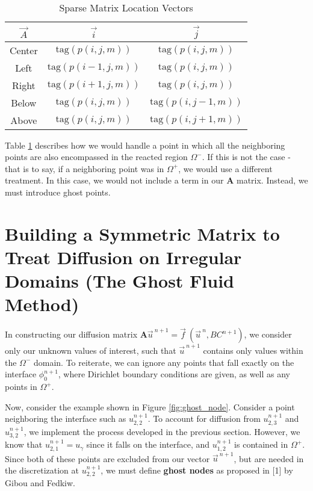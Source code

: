 \documentclass[oneside,12pt,final]{/Applications/TeX/packages/ucthesis-CA2012}
\begin{document}
\begin{mainmatter}
\begin{table} [ht]
\caption{Sparse Matrix Location Vectors}\label{table:Sparse_Vectors}
\centering
\begin{tabular}{c c c}
\hline
$\vec{A}$ & $\vec{i}$ & $\vec{j}$\\ \hline
Center   & $\text{tag}(p(i,j,m))$        &  $\text{tag}(p(i,j,m))$     \\
Left        & $\text{tag}(p(i-1,j,m))$    &  $\text{tag}(p(i,j,m))$     \\
Right     & $\text{tag}(p(i+1,j,m))$    &  $\text{tag}(p(i,j,m))$     \\
Below    & $\text{tag}(p(i,j,m))$        &  $\text{tag}(p(i,j-1,m))$   \\
Above    & $\text{tag}(p(i,j,m))$        &  $\text{tag}(p(i,j+1,m))$   \\
\end{tabular}
\end{table}

Table \ref{table:Sparse_Vectors} describes how we would handle a point in which all the neighboring points are also encompassed in the reacted region $\Omega^-$. If this is not the case - that is to say, if a neighboring point was in $\Omega^+$, we would use a different treatment. In this case, we would not include a term in our $\boldsymbol{A}$ matrix. Instead, we must introduce ghost points.

\section{Building a Symmetric Matrix to Treat Diffusion on Irregular Domains (The Ghost Fluid Method)}\label{section:Symmetric_Matrix}

In constructing our diffusion matrix $\boldsymbol{A}\vec{u}^{\>n+1} = \vec{f}\>(\vec{u}^{\>n},BC^{n+1})$, we consider only our unknown values of interest, such that $\vec{u}^{\>n+1}$ contains only values within the $\Omega^-$ domain. To reiterate, we can ignore any points that fall exactly on the interface $\phi_0^{n+1}$, where Dirichlet boundary conditions are given, as well as any points in $\Omega^+$.

Now, consider the example shown in Figure \ref{fig:ghost_node}. Consider a point neighboring the interface such as $u_{2,2}^{n+1}$. To account for diffusion from $u_{2,3}^{n+1}$ and $u_{3,2}^{n+1}$, we implement the process developed in the previous section. However, we know that $u_{2,1}^{n+1} = u_\gamma$ since it falls on the interface, and $u_{1,2}^{n+1}$ is contained in $\Omega^+$. Since both of these points are excluded from our vector $\vec{u}^{\>n+1}$, but are needed in the discretization at $u_{2,2}^{n+1}$, we must define \textbf{ghost nodes} as proposed in [1] by Gibou and Fedkiw.


\end{mainmatter}
\end{document}

